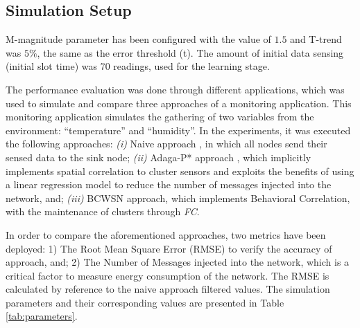 \documentclass{acm_proc_article-sp}
\begin{document}
\subsection{Simulation Setup}
\label{data-and-experiments}

M-magnitude parameter has been configured with the value of $1.5$ and T-trend
was $5\%$, the same as the error threshold (t). The amount of initial data sensing
(initial slot time) was 70 readings, used for the learning stage.
\vspace*{-.3cm}

The performance evaluation was done through different applications, which was used
to simulate and compare three approaches of a monitoring application. 
This monitoring application simulates the gathering of two variables from the
environment: ``temperature'' and ``humidity''.
In the experiments, it was executed the following approaches: {\it
  (i)} Naive approach \cite{Madden2005}, in which all nodes send their sensed
data to the sink node;  {\it
  (ii)} Adaga-P* approach \cite{MaiaACR2013}, which
implicitly implements spatial correlation to cluster sensors and exploits the
benefits of using a linear regression model to reduce the number of messages
injected into the network, and;  {\it 
  (iii)} BCWSN approach, which implements Behavioral Correlation, with the
  maintenance of clusters through \textit{FC}.
\vspace*{-.3cm}

In order to compare the aforementioned approaches, two metrics have been
deployed: 1) The Root Mean Square Error (RMSE) to verify the accuracy of
approach, and; 2) The Number of Messages injected into the network, which is a
critical factor to measure energy consumption of the network. The RMSE is
calculated by reference to the naive approach filtered values.
The simulation parameters and their corresponding values are presented in Table
\ref{tab:parameters}.
\end{document}
